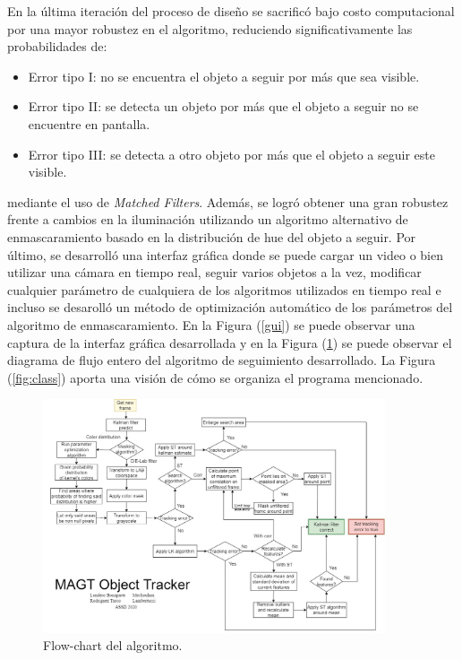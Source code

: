 En la última iteración del proceso de diseño se sacrificó bajo costo computacional por una mayor robustez en el algoritmo, reduciendo significativamente las probabilidades de:
\begin{itemize}
\item Error tipo I: no se encuentra el objeto a seguir por más que sea visible.
\item Error tipo II: se detecta un objeto por más que el objeto a seguir no se encuentre en pantalla.
\item Error tipo III: se detecta a otro objeto por más que el objeto a seguir este visible.
\end{itemize}
mediante el uso de \textit{Matched Filters}. Además, se logró obtener una gran robustez frente a cambios en la iluminación utilizando un algoritmo alternativo de enmascaramiento basado en la distribución de hue del objeto a seguir. Por último, se desarrolló una interfaz gráfica donde se puede cargar un video o bien utilizar una cámara en tiempo real, seguir varios objetos a la vez, modificar cualquier parámetro de cualquiera de los algoritmos utilizados en tiempo real e incluso se desarolló un método de optimización automático de los parámetros del algoritmo de enmascaramiento. En la Figura (\ref{gui}) se puede observar una captura de la interfaz gráfica desarrollada y en la Figura (\ref{fig:Flowchart}) se puede observar el diagrama de flujo entero del algoritmo de seguimiento desarrollado. La Figura (\ref{fig:class}) aporta una visión de cómo se organiza el programa mencionado.


\begin{figure}
	\centering
	\includegraphics[width=0.9\textwidth]{../flowchart.jpg}
	\caption{Flow-chart del algoritmo.}
	\label{fig:Flowchart}
\end{figure}

